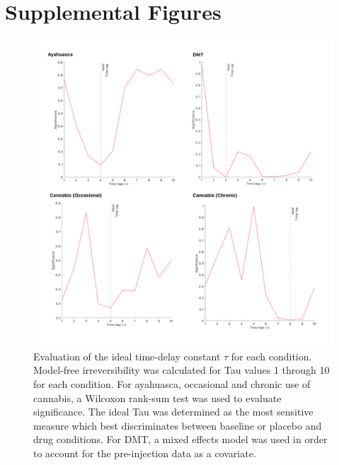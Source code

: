 \chapter{Supplemental Figures}

\begin{figure}
    \centering
    \includegraphics[width=\textwidth]{images/Appendix_ Tau Calculation.png}
    \caption[Establishing ideal $\tau$ for each condition.]{Evaluation of the ideal time-delay constant $\tau$ for each condition. Model-free irreversibility was calculated for Tau values 1 through 10 for each condition. For ayahuasca, occasional and chronic use of cannabis, a Wilcoxon rank-sum test was used to evaluate significance. The ideal Tau was determined as the most sensitive measure which best discriminates between baseline or placebo and drug conditions. For DMT, a mixed effects model was used in order to account for the pre-injection data as a covariate.}
    \label{fig:tau}
\end{figure}

